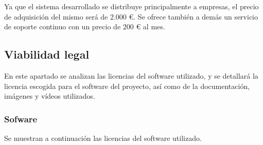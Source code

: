 Ya que el sistema desarrollado se distribuye principalmente a empresas, el precio de adquisición del
mismo será de 2.000 €. Se ofrece también a demás un servicio de soporte continuo con un precio de 
200 € al mes.


\subsection{Viabilidad legal}

En este apartado se analizan las licencias del software utilizado, y se detallará la licencia 
escogida para el software del proyecto, así como de la documentación, imágenes y vídeos utilizados.

\subsubsection{Sofware}

Se muestran a continuación las licencias del software utilizado.

